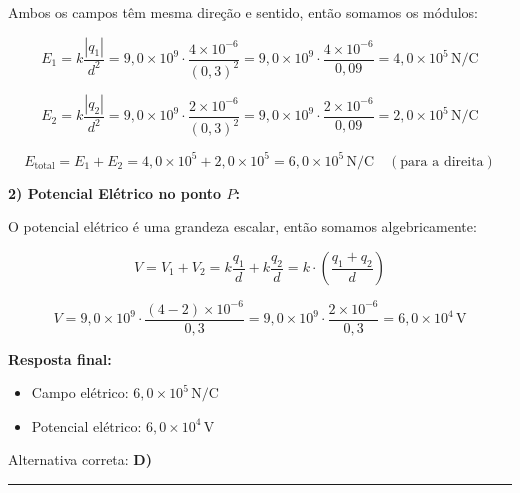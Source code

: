 \documentclass[a4paper,12pt]{article}
\begin{document}
\begin{flushleft}
Ambos os campos têm mesma direção e sentido, então somamos os módulos:

\[
E_1 = k \frac{|q_1|}{d^2} = 9{,}0 \times 10^9 \cdot \frac{4 \times 10^{-6}}{(0{,}3)^2}
= 9{,}0 \times 10^9 \cdot \frac{4 \times 10^{-6}}{0{,}09}
= 4{,}0 \times 10^5\,\text{N/C}
\]

\[
E_2 = k \frac{|q_2|}{d^2} = 9{,}0 \times 10^9 \cdot \frac{2 \times 10^{-6}}{(0{,}3)^2}
= 9{,}0 \times 10^9 \cdot \frac{2 \times 10^{-6}}{0{,}09}
= 2{,}0 \times 10^5\,\text{N/C}
\]

\[
E_{\text{total}} = E_1 + E_2 = 4{,}0 \times 10^5 + 2{,}0 \times 10^5 = 6{,}0 \times 10^5\,\text{N/C} \quad (\text{para a direita})
\]

\vspace{0.5cm}
\textbf{2) Potencial Elétrico no ponto \( P \):}

O potencial elétrico é uma grandeza escalar, então somamos algebricamente:

\[
V = V_1 + V_2
= k \frac{q_1}{d} + k \frac{q_2}{d}
= k \cdot \left( \frac{q_1 + q_2}{d} \right)
\]

\[
V = 9{,}0 \times 10^9 \cdot \frac{(4 - 2) \times 10^{-6}}{0{,}3}
= 9{,}0 \times 10^9 \cdot \frac{2 \times 10^{-6}}{0{,}3}
= 6{,}0 \times 10^4\,\text{V}
\]

\vspace{0.5cm}
\textbf{Resposta final:}

\begin{itemize}
    \item Campo elétrico: \( \boxed{6{,}0 \times 10^5\,\text{N/C}} \)
    \item Potencial elétrico: \( \boxed{6{,}0 \times 10^4\,\text{V}} \)
\end{itemize}

Alternativa correta: \colorbox{green!50}{\textbf{D)}}

\end{flushleft}

\noindent\rule{\linewidth}{0.6pt}\\
\end{document}
